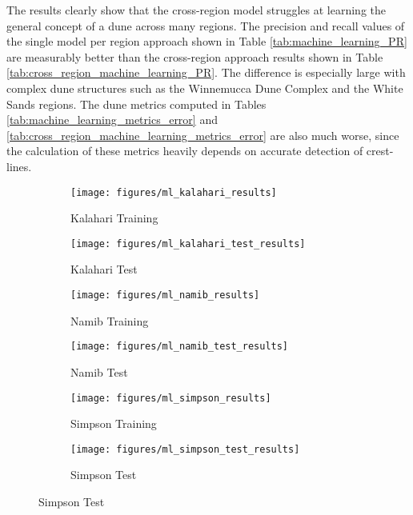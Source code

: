 The results clearly show that the cross-region model struggles at learning the general concept of a dune across many regions. The precision and recall values of the single model per region approach shown in Table \ref{tab:machine_learning_PR} are measurably better than the cross-region approach results shown in Table \ref{tab:cross_region_machine_learning_PR}. The difference is especially large with complex dune structures such as the Winnemucca Dune Complex and the White Sands regions. The dune metrics computed in Tables \ref{tab:machine_learning_metrics_error} and \ref{tab:cross_region_machine_learning_metrics_error} are also much worse, since the calculation of these metrics heavily depends on accurate detection of crest-lines.  

\begin{figure}
	\centering
	\begin{subfigure}{0.48\textwidth}
		\centering
		\texttt{[image: figures/ml\_kalahari\_results]}
		\caption{ Kalahari Training }
		\label{fig:ml_kalahari_results}
	\end{subfigure}
	\begin{subfigure}{0.48\textwidth}
		\centering
		\texttt{[image: figures/ml\_kalahari\_test\_results]}
		\caption{ Kalahari Test }
		\label{fig:ml_kalahari_test_results}
	\end{subfigure}
	\begin{subfigure}{0.48\textwidth}
		\centering
		\texttt{[image: figures/ml\_namib\_results]}
		\caption{ Namib Training }
		\label{fig:ml_namib_results}
	\end{subfigure}
	\begin{subfigure}{0.48\textwidth}
		\centering
		\texttt{[image: figures/ml\_namib\_test\_results]}
		\caption{ Namib Test }
		\label{fig:ml_namib_test_results}
	\end{subfigure}
	\begin{subfigure}{0.48\textwidth}
		\centering
		\texttt{[image: figures/ml\_simpson\_results]}
		\caption{ Simpson Training }
		\label{fig:ml_simpson_results}
	\end{subfigure}
	\begin{subfigure}{0.48\textwidth}
		\centering
		\texttt{[image: figures/ml\_simpson\_test\_results]}
		\caption{ Simpson Test }
		\label{fig:ml_simpson_test_results}
	\end{subfigure}
\end{figure}
